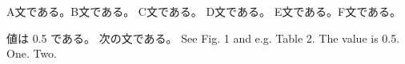 A文である。B文である。
C文である。
D文である。
E文である。F文である。

値は 0.5 である。
次の文である。
See Fig. 1 and e.g. Table 2. The value is 0.5.
One. Two.
